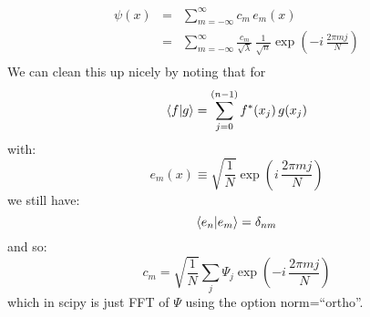 \documentclass[12pt]{book}
\begin{document}
\begin{eqnarray*}
\psi(x) &=& \sum_{m=-\infty}^{\infty}  c_m \, e_m(x)\\
        &=& \sum_{m=-\infty}^{\infty}  \frac{c_m}{\sqrt{\lambda}} \,        
        \frac{1}{\sqrt{n}}\exp\left( -i \, \frac{2 \pi m j}{N}\right)\\
\end{eqnarray*}
We can clean this up nicely by noting that for
\begin{equation}
\braket{f|g} = \sum_{j=0}^{(n-1)} f^*(x_j) \, g(x_j) 
\end{equation}
with:
\begin{equation}
e_m(x) \equiv \sqrt{\frac{1}{N}} \exp\left( i \, \frac{2 \pi m j}{N}\right)
\end{equation}
we still have:
\begin{equation}
\braket{e_n|e_m} = \delta_{nm}
\end{equation}
and so:
\begin{equation}
c_m = \sqrt{\frac{1}{N}} \sum_j  \Psi_j \exp\left( -i \, \frac{2 \pi m j}{N}\right)
\end{equation}
which in scipy is just FFT of $\Psi$ using the option norm=``ortho''.
\end{document}
